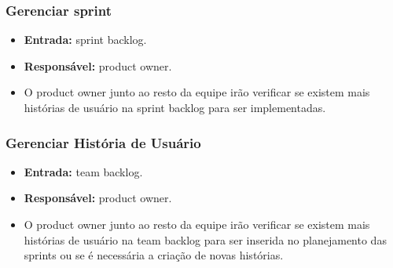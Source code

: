 \subsubsection{Gerenciar sprint}
  \begin{itemize}
    \item \textbf{Entrada:} sprint backlog.
    \item \textbf{Responsável:} product owner.
    \item O product owner junto ao resto da equipe irão verificar se existem mais histórias de usuário na sprint backlog para ser
      implementadas.
  \end{itemize}

\subsubsection{Gerenciar História de Usuário}
  \begin{itemize}
    \item \textbf{Entrada:} team backlog.
    \item \textbf{Responsável:} product owner.
    \item O product owner junto ao resto da equipe irão verificar se existem mais histórias de usuário na team backlog para ser
      inserida no planejamento das sprints ou se é necessária a criação de novas histórias.
  \end{itemize}
